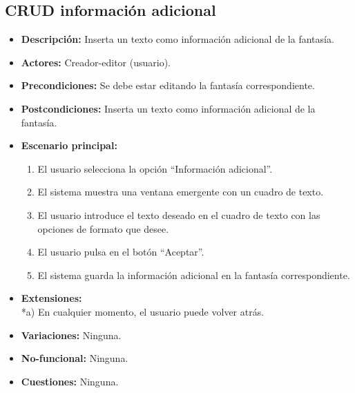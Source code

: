 \subsection{CRUD información adicional}
\begin{itemize}
	\item \textbf{Descripción:} Inserta un texto como información adicional de la fantasía.
	\item \textbf{Actores:} Creador-editor (usuario).
	\item \textbf{Precondiciones:} Se debe estar editando la fantasía correspondiente.
	\item \textbf{Postcondiciones:} Inserta un texto como información adicional de la fantasía.
	\item \textbf{Escenario principal:}
	\begin{enumerate}
		\item El usuario selecciona la opción ``Información adicional''.
		\item El sistema muestra una ventana emergente con un cuadro de texto.
		\item El usuario introduce el texto deseado en el cuadro de texto con las opciones de formato que desee. 
		\item El usuario pulsa en el botón ``Aceptar''.
		\item El sistema guarda la información adicional en la fantasía correspondiente.
	\end{enumerate}
	\item \textbf{Extensiones:} \\ *a) En cualquier momento, el usuario puede volver atrás.
	\item \textbf{Variaciones:} Ninguna.
	\item \textbf{No-funcional:} Ninguna.
	\item \textbf{Cuestiones:} Ninguna.
\end{itemize}

